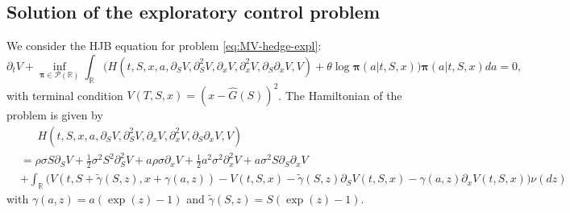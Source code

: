 \documentclass[11pt]{article}
\newcommand{\1}{\mathbbm{1}}
\newcommand{\bpi}{\boldsymbol{\pi}}
\begin{document}
\subsection{Solution of the exploratory control problem}
We consider the HJB equation for problem \eqref{eq:MV-hedge-expl}:
\begin{equation}
	\partial_tV +   \inf_{ \boldsymbol{\pi} \in \mathcal{P} (\mathbb{R})}\int_{\mathbb{R}} \big(    H(t,S,x,a,\partial_SV,\partial_S^2V,\partial_xV,\partial_x^2V,\partial_S\partial_xV,V) + \theta \log \bpi(a | t,S,x)\big) \bpi(a | t,S,x) da = 0, \label{eq:HJB-MV-hedge}
\end{equation}
with terminal condition $V(T,S,x) = (x-\hat{G}(S))^2$. The Hamiltonian of the problem is given by
\begin{align}
	&\phantom{=~}H(t,S,x,a,\partial_SV,\partial_S^2V,\partial_xV,\partial_x^2V,\partial_S\partial_xV,V)\\
	&= \rho\sigma S \partial_SV + \frac{1}{2}\sigma^2S^2 \partial_S^2V + a\rho\sigma \partial_xV + \frac{1}{2}a^2\sigma^2 \partial_x^2V + a\sigma^2S\partial_S\partial_xV \\
	& + \int_{\mathbb{R}} \big( V(t,S+\tilde{\gamma}(S,z),x+\gamma(a, z)) - V(t,S,x) -\tilde{\gamma}(S,z)\partial_SV(t,S,x)-\gamma(a,z)\partial_xV(t,S,x) \big) \nu(dz)\label{eq:Hal-QH}
\end{align}
with $\gamma(a,z)=a(\exp(z)-1)$ and $\tilde{\gamma}(S,z)=S(\exp(z)-1)$.
\end{document}
